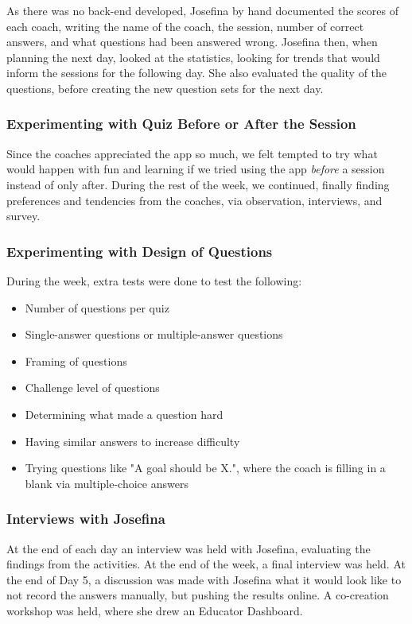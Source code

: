 As there was no back-end developed, Josefina by hand documented the scores of each coach, writing the name of the coach, the session, number of correct answers, and what questions had been answered wrong. Josefina then, when planning the next day, looked at the statistics, looking for trends that would inform the sessions for the following day. She also evaluated the quality of the questions, before creating the new question sets for the next day.

\subsubsection{Experimenting with Quiz Before or After the Session}
Since the coaches appreciated the app so much, we felt tempted to try what would happen with fun and learning if we tried using the app \textit{before} a session instead of only after. During the rest of the week, we continued, finally finding preferences and tendencies from the coaches, via observation, interviews, and survey.

\subsubsection{Experimenting with Design of Questions}
During the week, extra tests were done to test the following:

\begin{itemize}
\item Number of questions per quiz
\item Single-answer questions or multiple-answer questions
\item Framing of questions
\item Challenge level of questions
\item Determining what made a question hard
\item Having similar answers to increase difficulty
\item Trying questions like "A goal should be X.", where the coach is filling in a blank via multiple-choice answers
\end{itemize}

\subsubsection{Interviews with Josefina}
At the end of each day an interview was held with Josefina, evaluating the findings from the activities. At the end of the week, a final interview was held. At the end of Day 5, a discussion was made with Josefina what it would look like to not record the answers manually, but pushing the results online. A co-creation workshop was held, where she drew an Educator Dashboard.

